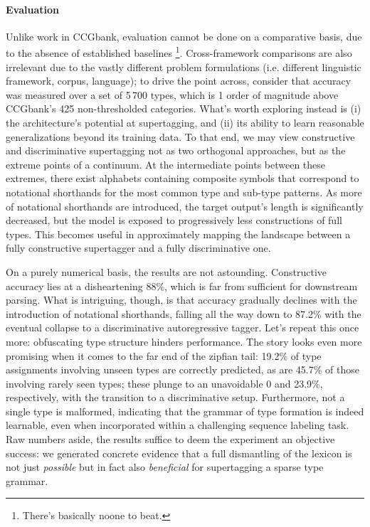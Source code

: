 \paragraph{Evaluation}
Unlike work in CCGbank, evaluation cannot be done on a comparative basis, due to the absence of established baselines%
	\footnote{There's basically noone to beat.}.
Cross-framework comparisons are also irrelevant due to the vastly different problem formulations (i.e. different linguistic framework, corpus, language); to drive the point across, consider that accuracy was measured over a set of 5\,700 types, which is 1 order of magnitude above CCGbank's 425 non-thresholded categories.
What's worth exploring instead is (i) the architecture's potential at supertagging, and (ii) its ability to learn reasonable generalizations beyond its training data.
To that end, we may view constructive and discriminative supertagging not as two orthogonal approaches, but as the extreme points of a continuum.
At the intermediate points between these extremes, there exist alphabets containing composite symbols that correspond to notational shorthands for the most common type and sub-type patterns.
As more of notational shorthands are introduced, the target output's length is significantly decreased, but the model is exposed to progressively less constructions of full types.
This becomes useful in approximately mapping the landscape between a fully constructive supertagger and a fully discriminative one.

On a purely numerical basis, the results are not astounding. 
Constructive accuracy lies at a disheartening 88\%, which is far from sufficient for downstream parsing.
What is intriguing, though, is that accuracy gradually declines with the introduction of notational shorthands, falling all the way down to 87.2\% with the eventual collapse to a discriminative autoregressive tagger.
Let's repeat this once more: obfuscating type structure hinders performance.
The story looks even more promising when it comes to the far end of the zipfian tail: 19.2\% of type assignments involving unseen types are correctly predicted, as are 45.7\% of those involving rarely seen types; these plunge to an unavoidable 0 and 23.9\%, respectively, with the transition to a discriminative setup.
Furthermore, not a single type is malformed, indicating that the grammar of type formation is indeed learnable, even when incorporated within a challenging sequence labeling task.
Raw numbers aside, the results suffice to deem the experiment an objective success: we generated concrete evidence that a full dismantling of the lexicon is not just \textit{possible} but in fact also \textit{beneficial} for supertagging a sparse type grammar.

